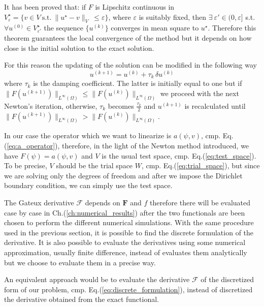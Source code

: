 It has been proved that: if $F$ is Lipschitz continuous in $V_{\varepsilon}^{\star}=\{v\in V\:\textrm{s.t.}\:\| u^{\star}-v \|_{V}\:\leq\varepsilon\}$, where $\varepsilon$ is suitably fixed, then $\exists\:\varepsilon'\in(0,\varepsilon]$ s.t. $\forall u^{(0)}\in V_{\varepsilon'}^{\star}$ the  sequence $\{ u^{(k)}\}$ converges in mean square to $u^{\star}$. Therefore this theorem guarantees the local convergence of the method but it depends on how close is the initial solution to the exact solution.

For this reason the updating of the solution can be modified in the following way
\begin{equation}
  u^{(k+1)}=u^{(k)}+\tau_{k}\,\delta u^{(k)}
\end{equation}
where $\tau_{k}$ is the damping coefficient. The latter is initially equal to one but if $\| F(u^{(k+1)})\|_{L^{\infty}(\Omega)}\leq\| F(u^{(k)})\|_{L^{\infty}(\Omega)}$ we proceed with the next Newton's iteration, otherwise, $\tau_{k}$ becomes $\frac{\tau_{k}}{2}$ and $u^{(k+1)}$ is recalculated until $\| F(u^{(k+1)})\|_{L^{\infty}(\Omega)}>\|F(u^{(k)})\|_{L^{\infty}(\Omega)}$.
\medskip

In our case the operator which we want to linearize is $a(\psi,v)$, cmp. Eq.(\ref{eq:a_operator}), therefore, in the light of the Newton method introduced, we have $F(\psi)=a(\psi,v)$ and $V$ is the usual test space, cmp. Eq.(\ref{eq:test_space}). To be precise, $V$ should be the trial space $W$, cmp. Eq.(\ref{eq:trial_space}), but since we are solving only the degrees of freedom and after we impose the Dirichlet boundary condition, we can simply use the test space.

The Gateux derivative $\mathcal{F}$ depends on $\mathbf{F}$ and $f$ therefore there will be evaluated case by case in Ch.(\ref{ch:numerical_results}) after the two functionals are been chosen to perform the different numerical simulations. With the same procedure used in the previous section, it is possible to find the discrete formulation of the derivative. It is also possible to evaluate the derivatives using some numerical approximation, usually finite difference, instead of evaluates them analytically but we choose to evaluate them in a precise way.
\medskip

An equivalent approach would be to evaluate the derivative $\mathcal{F}$ of the discretized form of our problem, cmp. Eq.(\ref{eq:discrete_formulation}), instead of discretized the derivative obtained from the exact functional.
